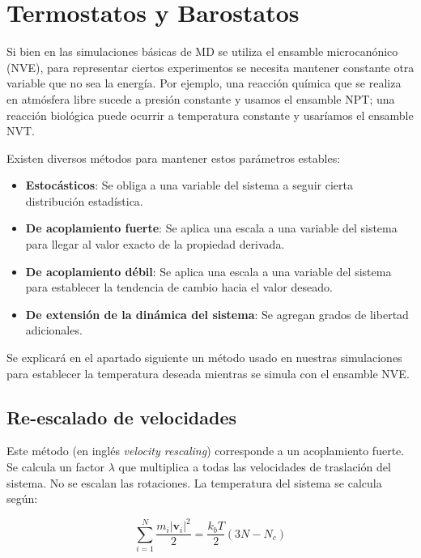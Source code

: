 \section{Termostatos y Barostatos}
\label{S2_5}

Si bien en las simulaciones básicas de MD se utiliza el ensamble microcanónico (NVE), para representar ciertos experimentos se necesita mantener constante otra variable que no sea la energía. Por ejemplo, una reacción química que se realiza en atmósfera libre sucede a presión constante y usamos el ensamble NPT; una reacción biológica puede ocurrir a temperatura constante y usaríamos el ensamble NVT.

Existen diversos métodos para mantener estos parámetros estables:

\begin{itemize}
	\item \textbf{Estocásticos}: Se obliga a una variable del sistema a seguir cierta distribución estadística.
	\item \textbf{De acoplamiento fuerte}: Se aplica una escala a una variable del sistema para llegar al valor exacto de la propiedad derivada.
	\item \textbf{De acoplamiento débil}: Se aplica una escala a una variable del sistema para establecer la tendencia de cambio hacia el valor deseado.
	\item \textbf{De extensión de la dinámica del sistema}: Se agregan grados de libertad adicionales.
\end{itemize}

Se explicará en el apartado siguiente un método usado en nuestras simulaciones para establecer la temperatura deseada mientras se simula con el ensamble NVE.

\subsection{Re-escalado de velocidades}
\label{S2_5_1}
Este método (en inglés \textit{velocity rescaling}) corresponde a un acoplamiento fuerte. Se calcula un factor $\lambda$ que multiplica a todas las velocidades de traslación del sistema. No se escalan las rotaciones. La temperatura del sistema se calcula según:

\begin{equation}
\sum_{i=1}^{N}\frac{m_{i}|\mathbf{v}_{i}|^{2}}{2} = \frac{k_{b}T}{2}(3N-N_{c})
\end{equation}

